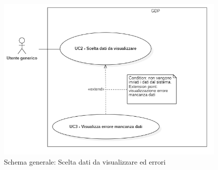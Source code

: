 \begin{center}
	\begin{figure}[H]
		\includegraphics[width=0.95\linewidth]{../immagini/attori_casi/uc2.png}
		\caption{Schema generale: Scelta dati da visualizzare ed errori}
	\end{figure}
\end{center}


